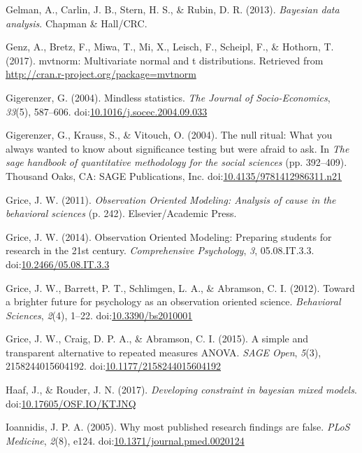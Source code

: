 \documentclass[english,mask,man]{apa6}
\theoremstyle{definition}
\theoremstyle{definition}
\theoremstyle{definition}
\theoremstyle{remark}
\begin{document}
\hypertarget{ref-Gelman2004}{}
Gelman, A., Carlin, J. B., Stern, H. S., \& Rubin, D. R. (2013).
\emph{Bayesian data analysis}. Chapman \& Hall/CRC.

\hypertarget{ref-Genz2017}{}
Genz, A., Bretz, F., Miwa, T., Mi, X., Leisch, F., Scheipl, F., \&
Hothorn, T. (2017). mvtnorm: Multivariate normal and t distributions.
Retrieved from \url{http://cran.r-project.org/package=mvtnorm}

\hypertarget{ref-Gigerenzer2004}{}
Gigerenzer, G. (2004). Mindless statistics. \emph{The Journal of
Socio-Economics}, \emph{33}(5), 587--606.
doi:\href{https://doi.org/10.1016/j.socec.2004.09.033}{10.1016/j.socec.2004.09.033}

\hypertarget{ref-Gigerenzer2004a}{}
Gigerenzer, G., Krauss, S., \& Vitouch, O. (2004). The null ritual: What
you always wanted to know about significance testing but were afraid to
ask. In \emph{The sage handbook of quantitative methodology for the
social sciences} (pp. 392--409). Thousand Oaks, CA: SAGE Publications,
Inc.
doi:\href{https://doi.org/10.4135/9781412986311.n21}{10.4135/9781412986311.n21}

\hypertarget{ref-Grice2011}{}
Grice, J. W. (2011). \emph{Observation Oriented Modeling: Analysis of
cause in the behavioral sciences} (p. 242). Elsevier/Academic Press.

\hypertarget{ref-Grice2014}{}
Grice, J. W. (2014). Observation Oriented Modeling: Preparing students
for research in the 21st century. \emph{Comprehensive Psychology},
\emph{3}, 05.08.IT.3.3.
doi:\href{https://doi.org/10.2466/05.08.IT.3.3}{10.2466/05.08.IT.3.3}

\hypertarget{ref-Grice2012}{}
Grice, J. W., Barrett, P. T., Schlimgen, L. A., \& Abramson, C. I.
(2012). Toward a brighter future for psychology as an observation
oriented science. \emph{Behavioral Sciences}, \emph{2}(4), 1--22.
doi:\href{https://doi.org/10.3390/bs2010001}{10.3390/bs2010001}

\hypertarget{ref-Grice2015}{}
Grice, J. W., Craig, D. P. A., \& Abramson, C. I. (2015). A simple and
transparent alternative to repeated measures ANOVA. \emph{SAGE Open},
\emph{5}(3), 2158244015604192.
doi:\href{https://doi.org/10.1177/2158244015604192}{10.1177/2158244015604192}

\hypertarget{ref-Haaf2017}{}
Haaf, J., \& Rouder, J. N. (2017). \emph{Developing constraint in
bayesian mixed models}.
doi:\href{https://doi.org/10.17605/OSF.IO/KTJNQ}{10.17605/OSF.IO/KTJNQ}

\hypertarget{ref-Ioannidis2005}{}
Ioannidis, J. P. A. (2005). Why most published research findings are
false. \emph{PLoS Medicine}, \emph{2}(8), e124.
doi:\href{https://doi.org/10.1371/journal.pmed.0020124}{10.1371/journal.pmed.0020124}
\end{document}
